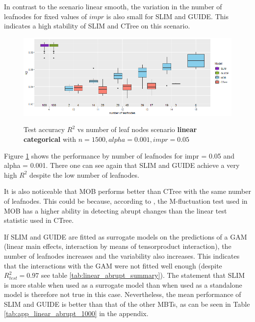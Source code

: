 In contrast to the scenario linear smooth, the variation in the number of leafnodes for fixed values of $impr$ is also small for SLIM and GUIDE. This indicates a high stability of SLIM and CTree on this scenario. 



\begin{figure}[!htb]
\caption{Test accuracy $R^2$ vs number of leaf nodes scenario \textbf{linear categorical} with $n=1500, alpha = 0.001, impr = 0.05$}
    \includegraphics[width=16cm]{Figures/simulations/batchtools/basic_scenarios/linear_abrupt/la_1000_standalone_r2_test.png}
    \label{fig:la_1000_standalone_r2_test}
\end{figure} 

Figure \ref{fig:la_1000_standalone_r2_test} shows the performance by number of leafnodes for impr = 0.05 and alpha = 0.001. There one can see again that SLIM and GUIDE achieve a very high $R^2$ despite the low number of leafnodes. 

It is also noticeable that MOB performs better than CTree with the same number of leafnodes.
This could be because, according to \citep{Schlosser.2019}, the M-fluctuation test used in MOB has a higher ability in detecting abrupt changes than the linear test statistic used in CTree.




If SLIM and GUIDE are fitted as surrogate models on the predictions of a GAM (linear main effects, interaction by means of tensorproduct interaction), the number of leafnodes increases and the variability also increases. This indicates that the interactions with the GAM were not fitted well enough (despite $R^2_{test} = 0.97$ see table \ref{tab:linear_abrupt_summary}). The statement that SLIM is more stable when used as a surrogate model than when used as a standalone model \citep{Hu.2020} is therefore not true in this case.
Nevertheless, the mean performance of SLIM and GUIDE is better than that of the other MBTs, as can be seen in Table \ref{tab:app_linear_abrupt_1000} in the appendix.




